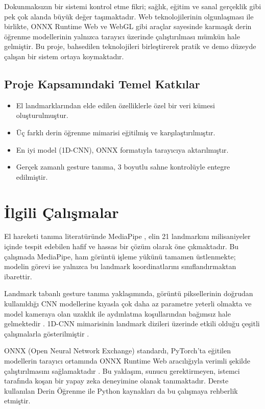 \documentclass[12pt,a4paper]{article}
\begin{document}
Dokunmaksızın bir sistemi kontrol etme fikri; sağlık, eğitim ve sanal gerçeklik gibi pek çok alanda büyük değer taşımaktadır. Web teknolojilerinin olgunlaşması ile birlikte, ONNX Runtime Web ve WebGL gibi araçlar sayesinde karmaşık derin öğrenme modellerinin yalnızca tarayıcı üzerinde çalıştırılması mümkün hale gelmiştir. Bu proje, bahsedilen teknolojileri birleştirerek pratik ve demo düzeyde çalışan bir sistem ortaya koymaktadır.

\subsection{Proje Kapsamındaki Temel Katkılar}

\begin{itemize}
    \item El landmarklarından elde edilen özelliklerle özel bir veri kümesi oluşturulmuştur.
    \item Üç farklı derin öğrenme mimarisi eğitilmiş ve karşılaştırılmıştır.
    \item En iyi model (1D-CNN), ONNX formatıyla tarayıcıya aktarılmıştır.
    \item Gerçek zamanlı gesture tanıma, 3 boyutlu sahne kontrolüyle entegre edilmiştir.
\end{itemize}

\section{İlgili Çalışmalar}

El hareketi tanıma literatüründe MediaPipe \cite{mediapipe}, elin 21 landmarkını milisaniyeler içinde tespit edebilen hafif ve hassas bir çözüm olarak öne çıkmaktadır. Bu çalışmada MediaPipe, ham görüntü işleme yükünü tamamen üstlenmekte; modelin görevi ise yalnızca bu landmark koordinatlarını sınıflandırmaktan ibarettir.

Landmark tabanlı gesture tanıma yaklaşımında, görüntü piksellerinin doğrudan kullanıldığı CNN modellerine kıyasla çok daha az parametre yeterli olmakta ve model kameraya olan uzaklık ile aydınlatma koşullarından bağımsız hale gelmektedir \cite{gesture_survey}. 1D-CNN mimarisinin landmark dizileri üzerinde etkili olduğu çeşitli çalışmalarla gösterilmiştir \cite{cnn_gesture}.

ONNX (Open Neural Network Exchange) standardı, PyTorch'ta eğitilen modellerin tarayıcı ortamında ONNX Runtime Web aracılığıyla verimli şekilde çalıştırılmasını sağlamaktadır \cite{onnx}. Bu yaklaşım, sunucu gerektirmeyen, istemci tarafında koşan bir yapay zeka deneyimine olanak tanımaktadır. Derste kullanılan Derin Öğrenme ile Python kaynakları da \cite{chollet_book, chollet_notebooks} bu çalışmaya rehberlik etmiştir.
\end{document}
